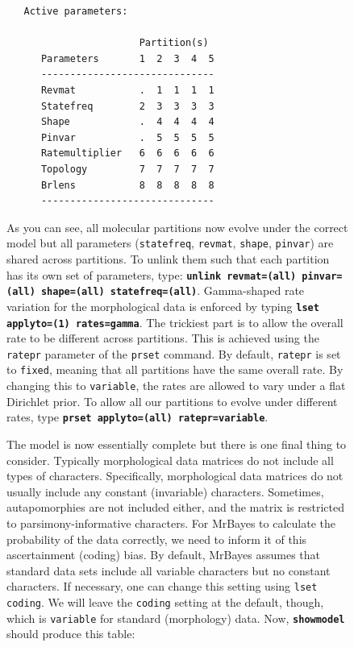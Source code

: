\documentclass[12pt]{book}
\newcommand{\ttt}[1]{\texttt{#1}}
\newcommand{\tb}[1]{\ttt{\textbf{#1}}}
\begin{document}
\begin{figure}[h]
\begin{singlespacing}
\footnotesize
\begin{verbatim}
   Active parameters:
 
                       Partition(s)
      Parameters       1  2  3  4  5
      ------------------------------
      Revmat           .  1  1  1  1
      Statefreq        2  3  3  3  3
      Shape            .  4  4  4  4
      Pinvar           .  5  5  5  5
      Ratemultiplier   6  6  6  6  6
      Topology         7  7  7  7  7
      Brlens           8  8  8  8  8
      ------------------------------
\end{verbatim}
\normalsize
\end{singlespacing}

As you can see, all molecular partitions now evolve under the correct model but all parameters
(\ttt{statefreq}, \ttt{revmat}, \ttt{shape}, \ttt{pinvar}) are shared across partitions. To unlink
them such that each partition has its own set of parameters, type: \tb{unlink revmat=(all)
pinvar=(all) shape=(all) statefreq=(all)}. Gamma-shaped rate variation for the morphological data
is enforced by typing \tb{lset applyto=(1) rates=gamma}. The trickiest part is to allow the overall
rate to be different across partitions. This is achieved using the \ttt{ratepr} parameter of the
\ttt{prset} command. By default, \ttt{ratepr} is set to \ttt{fixed}, meaning that all partitions
have the same overall rate. By changing this to \ttt{variable}, the rates are allowed to vary under
a flat Dirichlet prior. To allow all our partitions to evolve under different rates, type \tb{prset
applyto=(all) ratepr=variable}.

The model is now essentially complete but there is one final thing to consider. Typically
morphological data matrices do not include all types of characters. Specifically, morphological
data matrices do not usually include any constant (invariable) characters. Sometimes,
autapomorphies are not included either, and the matrix is restricted to parsimony-informative
characters. For MrBayes to calculate the probability of the data correctly, we need to inform it of
this ascertainment (coding) bias. By default, MrBayes assumes that standard data sets include all
variable characters but no constant characters. If necessary, one can change this setting using
\ttt{lset coding}. We will leave the \ttt{coding} setting at the default, though, which is
\ttt{variable} for standard (morphology) data. Now, \tb{showmodel} should produce this table:


\end{figure}
\end{document}
